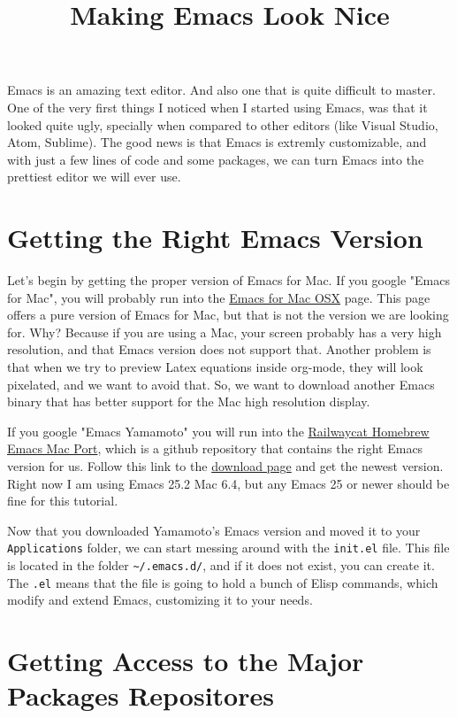 \documentclass[12pt, a4paper]{article}
\date{}
\title{Making Emacs Look Nice}
\begin{document}
\maketitle
Emacs is an amazing text editor. And also one that is quite difficult to master.
One of the very first things I noticed when I started using Emacs, was that it looked quite ugly, specially when compared to other editors (like Visual Studio, Atom, Sublime). The good news is that Emacs is extremly customizable, and with just a few lines of code and some packages, we can turn Emacs into the prettiest editor we will ever use.

\section{Getting the Right Emacs Version}
\label{sec:orga1750f4}

Let's begin by getting the proper version of Emacs for Mac. If you google "Emacs for Mac", you will probably run into the \href{https://emacsformacosx.com}{Emacs for Mac OSX} page. This page offers a pure version of Emacs for Mac, but that is not the version we are looking for. Why? Because if you are using a Mac, your screen probably has a very high resolution, and that Emacs version does not support that. Another problem is that when we try to preview Latex equations inside org-mode, they will look pixelated, and we want to avoid that. So, we want to download another Emacs binary that has better support for the Mac high resolution display.

If you google "Emacs Yamamoto" you will run into the \href{https://github.com/railwaycat/homebrew-emacsmacport}{Railwaycat Homebrew Emacs Mac Port}, which is a github repository that contains the right Emacs version for us. Follow this link to the \href{https://github.com/railwaycat/homebrew-emacsmacport/releases}{download page} and get the newest version. Right now I am using Emacs 25.2 Mac 6.4, but any Emacs 25 or newer should be fine for this tutorial.

Now that you downloaded Yamamoto's Emacs version and moved it to your \texttt{Applications} folder, we can start messing around with the \texttt{init.el} file. This file is located in the folder \texttt{\textasciitilde{}/.emacs.d/}, and if it does not exist, you can create it. The \texttt{.el} means that the file is going to hold a bunch of Elisp commands, which modify and extend Emacs, customizing it to your needs.

\section{Getting Access to the Major Packages Repositores}
\label{sec:orgd42b07c}
\end{document}
